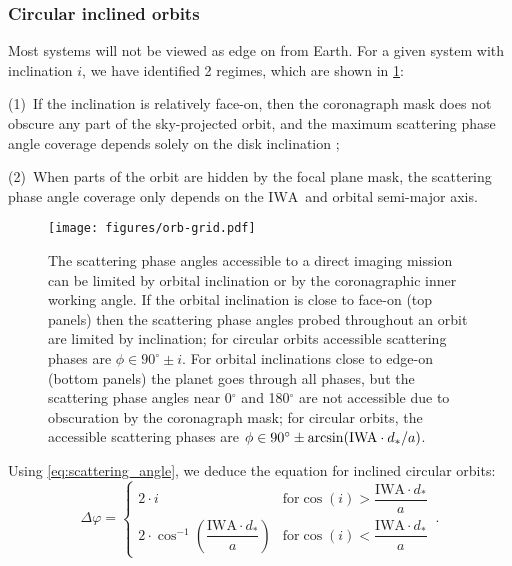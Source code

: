 \documentclass[
    usenatbib,
]{mnras}
\newcommand{\IWA}{\ensuremath{\mathrm{IWA}}}
\begin{document}

\subsubsection{Circular inclined orbits}

Most systems will not be viewed as edge on from Earth.
%
For a given system with inclination $i$, we have identified 2 regimes, which are shown in \cref{fig:orb-grid}:

(1)~If the inclination is relatively face-on, then the coronagraph mask does not obscure any part of the sky-projected orbit, and the maximum scattering phase angle coverage depends solely on the disk inclination ;

(2)~When parts of the orbit  are hidden by the focal plane mask, the scattering phase angle coverage only depends on the \IWA\ and orbital semi-major axis. 

\begin{figure}[htb]
   \centering
   \texttt{[image: figures/orb-grid.pdf]}
   \caption{
        The scattering phase angles accessible to a direct imaging mission can be limited by orbital inclination or by the coronagraphic inner working angle. 
        If the orbital inclination is close to face-on (top panels) then the scattering phase angles probed throughout an orbit are limited by inclination; for circular orbits accessible scattering phases are $\phi \in 90^\circ \pm i$. 
        For orbital inclinations close to edge-on (bottom panels) the planet goes through all phases, but the scattering phase angles near 0$^\circ$ and 180$^\circ$ are not accessible due to obscuration by the coronagraph mask; for circular orbits, the accessible scattering phases are $\phi \in 90^\circ \pm \arcsin({\rm IWA}\cdot d_*/a)$.
    }
    \label{fig:orb-grid}
\end{figure}

Using \cref{eq:scattering_angle}, we deduce the equation for inclined circular orbits: 
\begin{equation}
\label{eq:Delta_phi_max}
    \Delta \varphi = 
    \begin{cases}
        2 \cdot i & \textrm{for} \cos(i) > \dfrac{\mathrm{IWA}\cdot d_* }{a}
  \\ 
        2 \cdot \cos^{-1}\left(\dfrac{\mathrm{IWA}\cdot d_* }{a}\right)  & \textrm{for} \cos(i) < \dfrac{\mathrm{IWA}\cdot d_* }{a}
    \end{cases}\,.
\end{equation}
\end{document}
